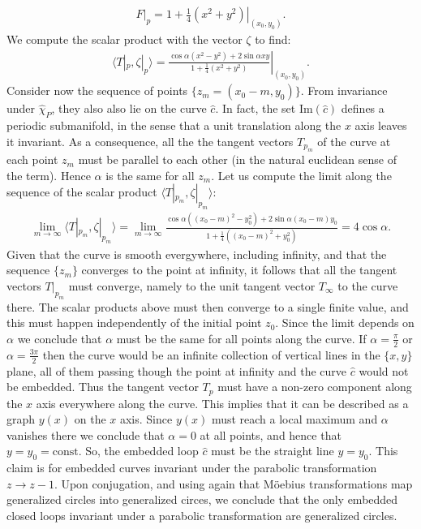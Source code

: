 \begin{align*}
F|_p = \left . 1 + \frac{1}{4} \left ( x^2 + y^2 \right ) \right |_{(x_0,y_0)}.
\end{align*}
We compute the scalar product with the vector $\zeta$ to find:
\begin{align*}
\langle T|_p, \zeta |_p \rangle
=
\left . \frac{\cos \alpha (x^2 - y^2 ) + 2 \sin \alpha xy }
{1 + \frac{1}{4} \left ( x^2 + y^2 \right )}
\right |_{(x_0,y_0)}.
\end{align*}
Consider now the sequence of points $\{ z_m = (x_0 -m, y_0)\} $. From
invariance under $\widehat{\chi}_P$, they also also lie on the curve
$\hat{c}$. In fact, the set $\mbox{Im}(\hat{c})$
defines a periodic submanifold, in the sense that 
a unit translation along the $x$ axis leaves it invariant.
As a consequence, all the the tangent 
vectors $T_{p_m}$
of the curve at each point $z_m$ must be parallel to each other
(in the natural euclidean sense of the term).
Hence $\alpha$ is the same for all $z_m$. Let us
compute the limit along the sequence of the scalar product
$\langle T|_{p_m}, \zeta |_{p_m} \rangle$:
\begin{align*}
\lim_{m \longrightarrow \infty}
\langle T|_{p_m}, \zeta |_{p_m} \rangle
=
\lim_{m \longrightarrow \infty}
\frac{
\cos \alpha ( (x_0-m)^2 - y_0^2 ) + 2 \sin \alpha (x_0 - m)
y_0 }{1 + \frac{1}{4} \left ( (x_0-m)^2 + y_0^2 \right )} =
4 \cos \alpha.
\end{align*}
Given that the curve is smooth evergywhere, including infinity,
and that the sequence $\{ z_m\}$ converges to the point at infinity,
it follows that all the tangent vectors $T|_{p_m}$ must converge,
namely to the unit tangent vector $T_{\infty} $ to the curve there. The scalar
products above must then converge to a single finite value, and this must happen
independently of the initial point $z_0$.
Since the limit depends on $\alpha$ we conclude that $\alpha$ must be
the same for all points along the curve. If $\alpha = \frac{\pi}{2}$
or $\alpha = \frac{3\pi}{2}$
then the curve would be an infinite collection of vertical lines
in the $\{ x,y\}$ plane, all of them passing though the point
at infinity and the curve $\hat{c}$ would not be embedded.
Thus the tangent vector $T_p$ must have a non-zero component
along the $x$ axis everywhere along the curve.
This implies that it can be described as a graph $y(x)$ on the $x$
axis. Since $y(x)$ must reach a local maximum and $\alpha$ vanishes there
we conclude that $\alpha=0$ at all points, and hence that 
$y=y_0 = \mbox{const}$.
So, the embedded loop $\hat{c}$ must be the straight line $y =y_0$. This claim is
for embedded curves invariant under  the parabolic transformation $z \rightarrow 
z -1$. Upon conjugation, and using again that M\"oebius transformations
map generalized circles into generalized circes, we conclude
that the only
embedded closed loops invariant under a parabolic transformation
are generalized circles.

